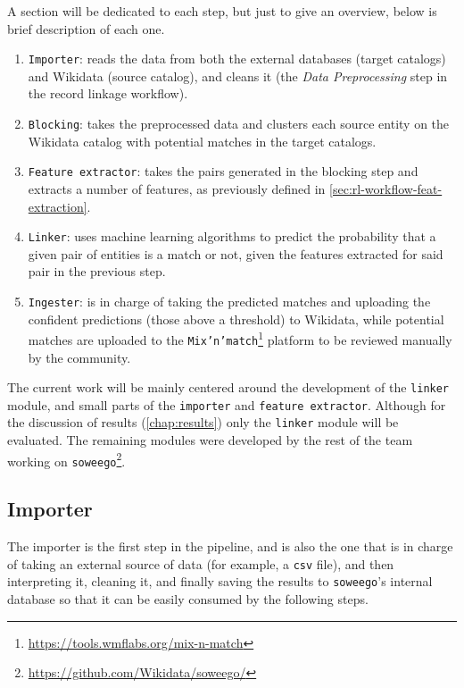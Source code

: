 \documentclass[epsfig,a4paper,11pt,titlepage,twoside,openany]{book}
\newcommand{\footurl}[1]{\footnote{\url{#1}}}
\begin{document}
A section will be dedicated to each step, but just to give an overview, below is brief description of each one.

\begin{enumerate}
\item \texttt{Importer}: 
reads the data from both the external databases (target catalogs) and Wikidata (source catalog), and cleans it (the \textit{Data Preprocessing} step in the record linkage workflow).
 
\item \texttt{Blocking}: 
takes the preprocessed data and clusters each source entity on the Wikidata catalog with potential matches in the target catalogs.
  
\item \texttt{Feature extractor}: 
takes the pairs generated in the blocking step and extracts a number of features, as previously defined in \autoref{sec:rl-workflow-feat-extraction}.
 
\item \texttt{Linker}: 
uses machine learning algorithms to predict the probability that a given pair of entities is a match or not, given the features extracted for said pair in the previous step.
 
\item \texttt{Ingester}: 
is in charge of taking the predicted matches and uploading the confident predictions (those above a threshold) to Wikidata, while potential matches are uploaded to the \texttt{Mix'n'match}\footurl{https://tools.wmflabs.org/mix-n-match} platform to be reviewed manually by the community.
\end{enumerate}

The current work will be mainly centered around the development of the \texttt{linker} module, and small parts of the \texttt{importer} and \texttt{feature extractor}. Although for the discussion of results  (\autoref{chap:results}) only the \texttt{linker} module will be evaluated.  The remaining modules were developed by the rest of the team working on \texttt{soweego}\footurl{https://github.com/Wikidata/soweego/}.


\subsection{Importer}
\label{sec:soweego-st-importer}

The importer is the first step in the pipeline, and is also the one that is in charge of taking an external source of data (for example, a \texttt{csv} file), and then interpreting it, cleaning it, and finally saving the results to \texttt{soweego}'s internal database so that it can be easily consumed by the following steps.
\end{document}
